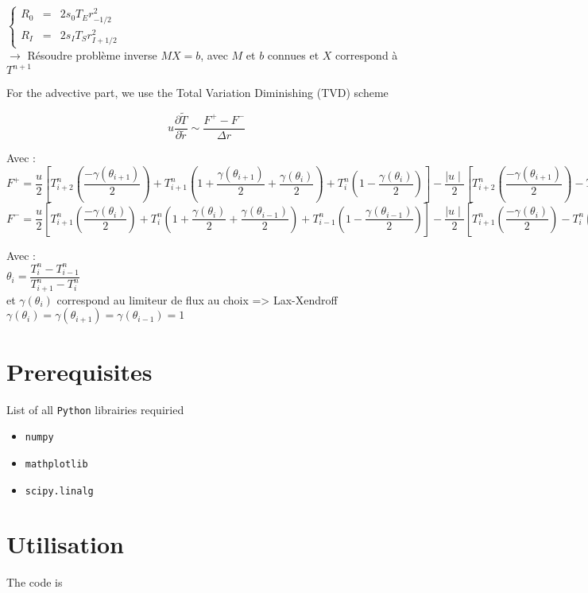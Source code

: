 \documentclass[legalpaper,12pt]{article}
\renewcommand{\it}{\item[$\bullet$]}
\begin{document}
	\noindent
	\begin{math}
		\left\{ \begin{matrix}
			R_{0} & = & 2s_{0}T_{E}r_{-1/2}^{2}\\
			R_{I} & = & 2s_{I}T_{S}r_{I+1/2}^{2}
		\end{matrix}
		\right.
	\end{math}
	\\[1cm]
	$\rightarrow$ Résoudre problème inverse $MX = b$, avec $M$ et $b$ connues et $X$ correspond à $T^{n+1}$
	
	For the advective part, we use the Total Variation Diminishing (TVD) scheme 
	
	
	\begin{equation}
		u\dfrac{\partial \tilde{T}}{\partial \tilde{r}} \sim \dfrac{F^{+} - F^{-}}{\Delta r}
	\end{equation}
	
	Avec : 
	\\[1cm]
	\begin{math}
		F^{+} = \dfrac{u}{2}[T_{i+2}^{n}(\dfrac{-\gamma(\theta_{i+1})}{2}) + T_{i+1}^{n}(1 + \dfrac{\gamma(\theta_{i+1})}{2} +  \dfrac{\gamma(\theta_{i})}{2}) + T_{i}^{n}(1 - \dfrac{\gamma(\theta_{i})}{2})] - \dfrac{\mid u\mid}{2}[T_{i+2}^{n}(\dfrac{-\gamma(\theta_{i+1})}{2}) - T_{i+1}^{n}(1 + \dfrac{\gamma(\theta_{i+1})}{2} +  \dfrac{-\gamma(\theta_{i})}{2}) + T_{i}^{n}(\dfrac{\gamma(\theta_{i})}{2} - 1)] 
	\end{math}
	\\[1cm]
	\begin{math}
		F^{-} = \dfrac{u}{2}[T_{i+1}^{n}(\dfrac{-\gamma(\theta_{i})}{2}) + T_{i}^{n}(1 + \dfrac{\gamma(\theta_{i})}{2} +  \dfrac{\gamma(\theta_{i-1})}{2}) + T_{i-1}^{n}(1 - \dfrac{\gamma(\theta_{i-1})}{2})] - \dfrac{\mid u\mid}{2}[T_{i+1}^{n}(\dfrac{-\gamma(\theta_{i})}{2}) - T_{i}^{n}(1 + \dfrac{\gamma(\theta_{i})}{2} - \dfrac{\gamma(\theta_{i-1})}{2}) + T_{i-1}^{n}(\dfrac{\gamma(\theta_{i})}{2} - 1)] 
	\end{math}
	
	Avec : 
	\\[1cm]
	
	\begin{math}
		\theta_{i} = \dfrac{T_{i}^{n} - T_{i-1}^{n}}{T_{i+1}^{n} - T_{i}^{n}} 
	\end{math}
	\\[1cm]
	et $\gamma(\theta_{i})$ correspond au limiteur de flux au choix => Lax-Xendroff $\gamma(\theta_{i}) = \gamma(\theta_{i+1}) = \gamma(\theta_{i-1}) = 1$
	
	
	
	
	
	\section*{Prerequisites}
	\noindent\hrulefill
	
	 List of all \verb*|Python| librairies requiried
	 
	 \begin{itemize}
	 	\it \verb*|numpy|
	 	\it \verb*|mathplotlib|
	 	\it \verb*|scipy.linalg|
	 \end{itemize}
	
	\section*{Utilisation}
	
	The code is 
	
\end{document}
